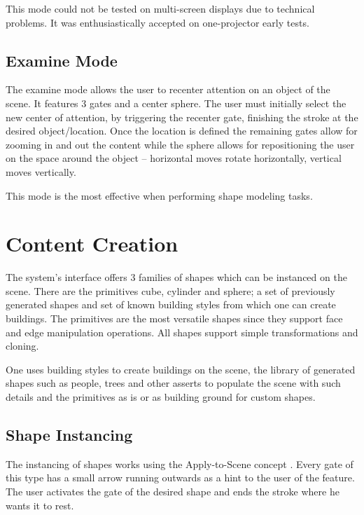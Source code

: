 This mode could not be tested on multi-screen displays due to technical problems. It was enthusiastically accepted on
one-projector early tests.



\subsection{Examine Mode}

The examine mode allows the user to recenter attention on an object of the scene.
It features 3 gates and a center sphere.
The user must initially select the new center of attention, by triggering the recenter gate,
finishing the stroke at the desired object/location.
Once the location is defined the remaining gates allow for zooming in and out the content
while the sphere allows for repositioning the user on the space around the object -- 
horizontal moves rotate horizontally, vertical moves vertically.

This mode is the most effective when performing shape modeling tasks.



\section{Content Creation}

The system's interface offers 3 families of shapes which can be instanced on the scene.
There are the primitives cube, cylinder and sphere; a set of previously generated shapes
and set of known building styles from which one can create buildings.
The primitives are the most versatile shapes since they support face and edge manipulation operations.
All shapes support simple transformations and cloning.

One uses building styles to create buildings on the scene, the library of generated shapes such as
people, trees and other asserts to populate the scene with such details and the primitives as is or as
building ground for custom shapes.



\subsection{Shape Instancing}

The instancing of shapes works using the Apply-to-Scene concept .
Every gate of this type has a small arrow running outwards as a hint to the user of the feature.
The user activates the gate of the desired shape and ends the stroke where he wants it to rest.

